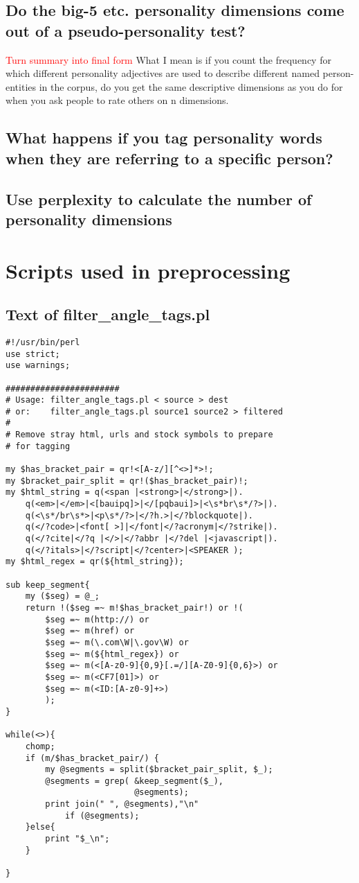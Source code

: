 \documentclass[10pt,letterpaper]{book}
\newcommand{\todo}[1]{\textcolor{red}{#1}}
\begin{document}
\section{Do the big-5 etc. personality dimensions come out of a pseudo-personality test?}
\todo{Turn summary into final form}
What I mean is if you count the frequency for which different personality adjectives are used to describe different named person-entities in the corpus, do you get the same descriptive dimensions as you do for when you ask people to rate others on n dimensions.

\section{What happens if you tag personality words when they are referring to a specific person?}

\section{Use perplexity to calculate the number of personality dimensions}

\appendix
\chapter{Scripts used in preprocessing}
\section{Text of filter\_angle\_tags.pl}
\label{app:filterangletags}
\lstset{language=Perl}
\begin{lstlisting}
#!/usr/bin/perl
use strict;
use warnings;

#######################
# Usage: filter_angle_tags.pl < source > dest
# or:    filter_angle_tags.pl source1 source2 > filtered
#
# Remove stray html, urls and stock symbols to prepare
# for tagging

my $has_bracket_pair = qr!<[A-z/][^<>]*>!;
my $bracket_pair_split = qr!($has_bracket_pair)!;
my $html_string = q(<span |<strong>|</strong>|).
    q(<em>|</em>|<[bauipq]>|</[pqbaui]>|<\s*br\s*/?>|).
    q(<\s*/br\s*>|<p\s*/?>|</?h.>|</?blockquote|).
    q(</?code>|<font[ >]|</font|</?acronym|</?strike|).
    q(</?cite|</?q |</>|</?abbr |</?del |<javascript|).
    q(</?itals>|</?script|</?center>|<SPEAKER );
my $html_regex = qr(${html_string});

sub keep_segment{
    my ($seg) = @_;
    return !($seg =~ m!$has_bracket_pair!) or !(
        $seg =~ m(http://) or
        $seg =~ m(href) or
        $seg =~ m(\.com\W|\.gov\W) or
        $seg =~ m(${html_regex}) or
        $seg =~ m(<[A-z0-9]{0,9}[.=/][A-Z0-9]{0,6}>) or
        $seg =~ m(<CF7[01]>) or
        $seg =~ m(<ID:[A-z0-9]+>)
        );
}

while(<>){
    chomp;
    if (m/$has_bracket_pair/) {
        my @segments = split($bracket_pair_split, $_);
        @segments = grep( &keep_segment($_), 
                          @segments);
        print join(" ", @segments),"\n" 
            if (@segments);
    }else{
        print "$_\n";
    }

}
\end{lstlisting}
\end{document}
